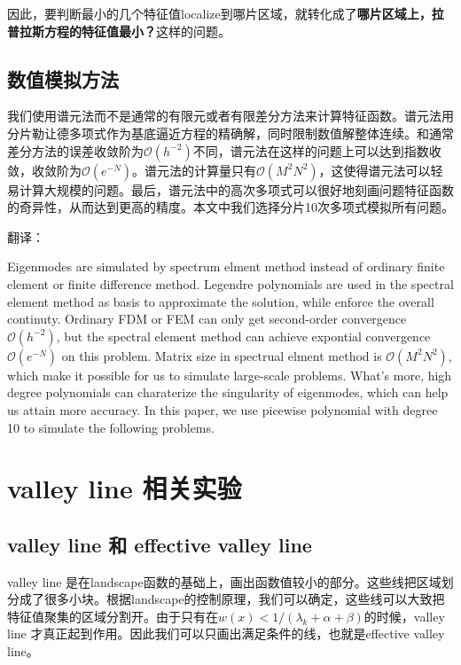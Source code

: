 \documentclass[12pt,a4paper]{article}
\begin{document}
因此，要判断最小的几个特征值localize到哪片区域，就转化成了\textbf{哪片区域上，拉普拉斯方程的特征值最小？}这样的问题。

\subsection{数值模拟方法}

我们使用谱元法而不是通常的有限元或者有限差分方法来计算特征函数。谱元法用分片勒让德多项式作为基底逼近方程的精确解，同时限制数值解整体连续。和通常差分方法的误差收敛阶为$\mathcal{O}(h^{-2})$不同，谱元法在这样的问题上可以达到指数收敛，收敛阶为$\mathcal{O}(e^{-N})$。谱元法的计算量只有$\mathcal{O}(M^2 N^2)$，这使得谱元法可以轻易计算大规模的问题。最后，谱元法中的高次多项式可以很好地刻画问题特征函数的奇异性，从而达到更高的精度。本文中我们选择分片10次多项式模拟所有问题。

翻译：

Eigenmodes are simulated by spectrum elment method instead of ordinary finite element or finite difference method. Legendre polynomials are used in the spectral element method as basis to approximate the solution, while enforce the overall continuty. Ordinary FDM or FEM can only get second-order convergence $\mathcal{O}(h^{-2})$, but the spectral element method can achieve expontial convergence $\mathcal{O}(e^{-N})$ on this problem. Matrix size in spectrual elment method is $\mathcal{O}(M^2 N^2)$, which make it possible for us to simulate large-scale problems. What's more, high degree polynomials can charaterize the singularity of eigenmodes, which can help us attain more accuracy. In this paper, we use picewise polynomial with degree 10 to simulate the following problems.

\newpage

\section{valley line 相关实验}\label{valley}

\subsection{valley line 和 effective valley line}

valley line 是在landscape函数的基础上，画出函数值较小的部分。这些线把区域划分成了很多小块。根据landscape的控制原理，我们可以确定，这些线可以大致把特征值聚集的区域分割开。由于只有在$w(x) < 1/(\lambda_k + \alpha + \beta)$的时候，valley line 才真正起到作用。因此我们可以只画出满足条件的线，也就是effective valley line。
\end{document}
